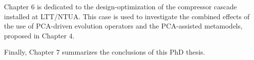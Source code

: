 Chapter $6$ is dedicated to the design-optimization of the compressor cascade installed at LTT/NTUA. This case is used to investigate the combined effects of the use of PCA-driven evolution operators and the PCA-assisted metamodels,  proposed in Chapter $4$.

Finally, Chapter $7$ summarizes the conclusions of this PhD thesis.      









